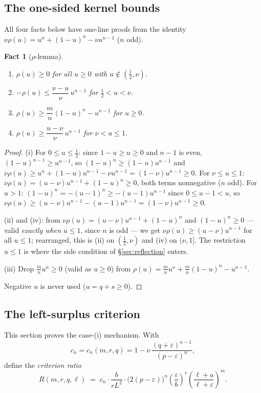 \documentclass[11pt]{article}
\theoremstyle{remark}
\theoremstyle{plain}
\newtheorem{fact}[theorem]{Fact}
\theoremstyle{plain}
\begin{document}
\subsection{The one-sided kernel bounds}\label{sec:rho}

All four facts below have one-line proofs from the identity $\nu\rho(u)=u^n+(1-u)^n-\nu u^{n-1}$ ($n$ odd).

\begin{fact}[$\rho$-lemma]\label{fact:rho}
\begin{enumerate}[label=\textup{(\roman*)}]
\item $\rho(u)\ge0$ for all $u\ge0$ with $u\notin(\tfrac12,\nu)$.
\item $-\rho(u)\le\dfrac{\nu-u}{\nu}\,u^{n-1}$ for $\tfrac12<u<\nu$.
\item $\rho(u)\ge\dfrac mn(1-u)^n-u^{n-1}$ for $u\ge0$.
\item $\rho(u)\ge\dfrac{u-\nu}{\nu}\,u^{n-1}$ for $\nu<u\le1$.
\end{enumerate}
\end{fact}

\begin{proof}
(i) For $0\le u\le\tfrac12$: since $1-u\ge u\ge0$ and $n-1$ is even, $(1-u)^{n-1}\ge u^{n-1}$, so $(1-u)^n\ge(1-u)u^{n-1}$ and
$\nu\rho(u)\ge u^n+(1-u)u^{n-1}-\nu u^{n-1}=(1-\nu)u^{n-1}\ge0$.
For $\nu\le u\le1$: $\nu\rho(u)=(u-\nu)u^{n-1}+(1-u)^n\ge0$, both terms nonnegative ($n$ odd).
For $u>1$: $(1-u)^n=-(u-1)^n\ge-(u-1)u^{n-1}$ since $0\le u-1<u$, so $\nu\rho(u)\ge(u-\nu)u^{n-1}-(u-1)u^{n-1}=(1-\nu)u^{n-1}\ge0$.

(ii) and (iv): from $\nu\rho(u)=(u-\nu)u^{n-1}+(1-u)^n$ and $(1-u)^n\ge0$ --- valid \emph{exactly when} $u\le1$, since $n$ is odd --- we get $\nu\rho(u)\ge(u-\nu)u^{n-1}$ for all $u\le1$; rearranged, this is (ii) on $(\tfrac12,\nu)$ and (iv) on $(\nu,1]$.  The restriction $u\le1$ is where the side condition of \S\ref{sec:reflection} enters.

(iii) Drop $\tfrac mn u^n\ge0$ (valid as $u\ge0$) from $\rho(u)=\tfrac mn u^n+\tfrac mn(1-u)^n-u^{n-1}$.

Negative $u$ is never used ($u=q+s\ge0$).
\end{proof}

\subsection{The left-surplus criterion}\label{sec:leftsurplus}

This section proves the case-(i) mechanism.  With
\begin{equation}\label{eq:cn}
        c_n=c_n(m,r,q)=1-\nu\,\frac{(q+\varepsilon)^{n-1}}{(p-\varepsilon)^{n}},
\end{equation}
define the \emph{criterion ratio}
\begin{equation}\label{eq:R}
        R(m,r,q,\ell)
        \;=\;
        c_n\cdot\frac{b}{r L^{2}}\cdot
        \bigl(2(p-\varepsilon)\bigr)^{n}
        \left(\frac{\varepsilon}{b}\right)^{r}
        \left(\frac{\ell+a}{\ell+\varepsilon}\right)^{m}.
\end{equation}
\end{document}
